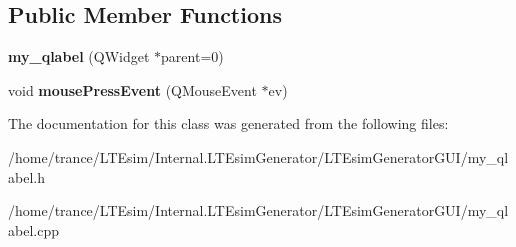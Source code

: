 \subsection*{Public Member Functions}
\begin{DoxyCompactItemize}
\item 
{\bfseries my\+\_\+qlabel} (Q\+Widget $\ast$parent=0)\hypertarget{classmy__qlabel_a4e22b772e99fc3d676dc77e1c72fd236}{}\label{classmy__qlabel_a4e22b772e99fc3d676dc77e1c72fd236}

\item 
void {\bfseries mouse\+Press\+Event} (Q\+Mouse\+Event $\ast$ev)\hypertarget{classmy__qlabel_a48997ce97f827f4f69bcbcc1c3755da6}{}\label{classmy__qlabel_a48997ce97f827f4f69bcbcc1c3755da6}

\end{DoxyCompactItemize}


The documentation for this class was generated from the following files\+:\begin{DoxyCompactItemize}
\item 
/home/trance/\+L\+T\+Esim/\+Internal.\+L\+T\+Esim\+Generator/\+L\+T\+Esim\+Generator\+G\+U\+I/my\+\_\+qlabel.\+h\item 
/home/trance/\+L\+T\+Esim/\+Internal.\+L\+T\+Esim\+Generator/\+L\+T\+Esim\+Generator\+G\+U\+I/my\+\_\+qlabel.\+cpp\end{DoxyCompactItemize}
